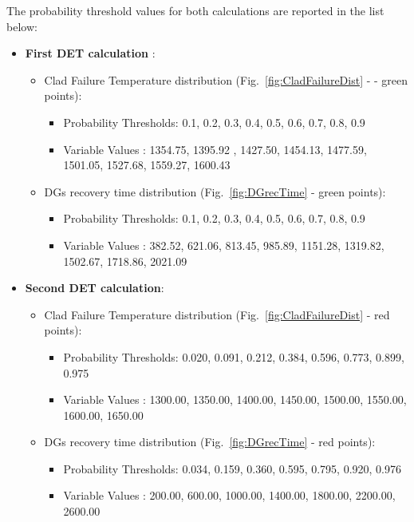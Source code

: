 \documentclass{mc2013}
\begin{document}
\vspace{-5mm}
The probability threshold values for both calculations are reported in the list below:
\vspace{-5mm}
 \begin{itemize}
   \item \textbf{First DET calculation} :
   \begin{itemize}
       \item Clad Failure Temperature distribution (Fig.~\ref{fig:CladFailureDist} -  - green points): 
       \begin{itemize} 
            \item Probability Thresholds: 0.1, 0.2, 0.3, 0.4, 0.5, 0.6, 0.7, 0.8, 0.9
            \item Variable Values           : 1354.75, 1395.92 , 1427.50, 1454.13, 1477.59, 1501.05, 1527.68, 1559.27, 1600.43 
       \end{itemize}
       \item DGs recovery time distribution (Fig.~\ref{fig:DGrecTime} - green points): 
       \begin{itemize} 
            \item Probability Thresholds: 0.1, 0.2, 0.3, 0.4, 0.5, 0.6, 0.7, 0.8, 0.9
            \item Variable Values           : 382.52, 621.06, 813.45, 985.89, 1151.28, 1319.82, 1502.67, 1718.86, 2021.09 
       \end{itemize}
    \end{itemize}
   \item \textbf{Second DET calculation}:
   \begin{itemize}
       \item Clad Failure Temperature distribution (Fig.~\ref{fig:CladFailureDist} - red points): 
       \begin{itemize} 
            \item Probability Thresholds: 0.020, 0.091, 0.212, 0.384, 0.596, 0.773, 0.899, 0.975
            \item Variable Values           : 1300.00, 1350.00, 1400.00, 1450.00, 1500.00, 1550.00, 1600.00, 1650.00 
       \end{itemize}
       \item DGs recovery time distribution (Fig.~\ref{fig:DGrecTime} - red points): 
       \begin{itemize} 
            \item Probability Thresholds: 0.034, 0.159, 0.360, 0.595, 0.795, 0.920, 0.976
            \item Variable Values           : 200.00, 600.00, 1000.00, 1400.00, 1800.00, 2200.00, 2600.00 
       \end{itemize}
    \end{itemize}
\end{itemize}
\vspace{-5mm}
\end{document}
